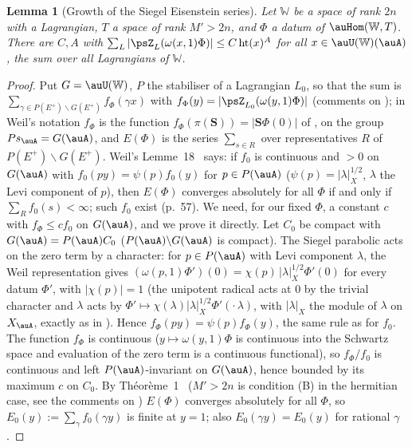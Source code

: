 \documentclass[10pt]{amsart}
\newtheorem{lemma}[theorem]{Lemma}
\theoremstyle{definition}
\theoremstyle{remark}
\providecommand{\pcW}{\mathbb W}
\begin{document}
\begin{lemma}[Growth of the Siegel Eisenstein series]\label{psr:Egrowth}
Let $\pcW$ be a space of rank $2n$ with a Lagrangian, $T$ a space of rank $M'>2n$, and $\Phi$ a datum of
$\auHom(\pcW,T)$. There are $C,A$ with $\sum_L|\psZ_L(\omega(x,1)\Phi)|\le C\,\mathrm{ht}(x)^A$ for all
$x\in\auU(\pcW)(\auA)$, the sum over all Lagrangians of $\pcW$.
\end{lemma}
\begin{proof}
Put $G=\auU(\pcW)$, $P$ the stabiliser of a Lagrangian $L_0$, so that the sum is $\sum_{\gamma\in P(E^+)
\backslash G(E^+)}f_\Phi(\gamma x)$ with $f_\Phi(y)=|\psZ_{L_0}(\omega(y,1)\Phi)|$ (comments on
{\cite[Lemma~2.13]{P53}}); in Weil's notation $f_\Phi$ is the function $f_\Phi(\pi(\mathbf S))=|\mathbf S\Phi(0)|$ of
\cite[no.~39]{WeilSiegel}, on the group $Ps_\auA=G(\auA)$, and $E(\Phi)$ is the series $\sum_{s\in R}$ over
representatives $R$ of $P(E^+)\backslash G(E^+)$. Weil's Lemme~18~\cite[no.~39]{WeilSiegel} says: if $f_0$ is
continuous and $>0$ on $G(\auA)$ with $f_0(py)=\psi(p)f_0(y)$ for $p\in P(\auA)$ ($\psi(p)=|\lambda|_X^{1/2}$, $\lambda$
the Levi component of $p$), then $E(\Phi)$ converges absolutely for all $\Phi$ if and only if $\sum_Rf_0(s)<\infty$;
such $f_0$ exist (p.~57). We need, for our fixed $\Phi$, a constant $c$ with $f_\Phi\le cf_0$ on $G(\auA)$, and
we prove it directly. Let $C_0$ be compact with $G(\auA)=P(\auA)C_0$ ($P(\auA)\backslash G(\auA)$ is compact). The Siegel parabolic acts on the zero term by a character: for $p\in P(\auA)$ with Levi
component $\lambda$, the Weil representation gives $(\omega(p,1)\Phi')(0)=\chi(p)\,|\lambda|_X^{1/2}\Phi'(0)$ for
every datum $\Phi'$, with $|\chi(p)|=1$ (the unipotent radical acts at $0$ by the trivial character and $\lambda$
acts by $\Phi'\mapsto\chi(\lambda)|\lambda|_X^{1/2}\Phi'(\cdot\,\lambda)$, with $|\lambda|_X$ the module of $\lambda$ on
$X_\auA$, exactly as in \cite[no.~39]{WeilSiegel}). Hence $f_\Phi(py)=\psi(p)f_\Phi(y)$, the same rule as for
$f_0$. The function $f_\Phi$ is continuous ($y\mapsto\omega(y,1)\Phi$ is continuous into the Schwartz space and
evaluation of the zero term is a continuous functional), so $f_\Phi/f_0$ is continuous and left
$P(\auA)$-invariant on $G(\auA)$, hence bounded by its maximum $c$ on $C_0$. By Th\'eor\`eme~1~\cite[no.~40]{WeilSiegel} ($M'>2n$ is condition (B) in the hermitian case,
see the comments on {\cite[Lemma~2.13]{P53}}) $E(\Phi)$ converges absolutely for all $\Phi$, so
$E_0(y):=\sum_{\gamma}f_0(\gamma y)$ is finite at $y=1$; also $E_0(\gamma y)=E_0(y)$ for rational $\gamma$.


\end{proof}
\end{document}
